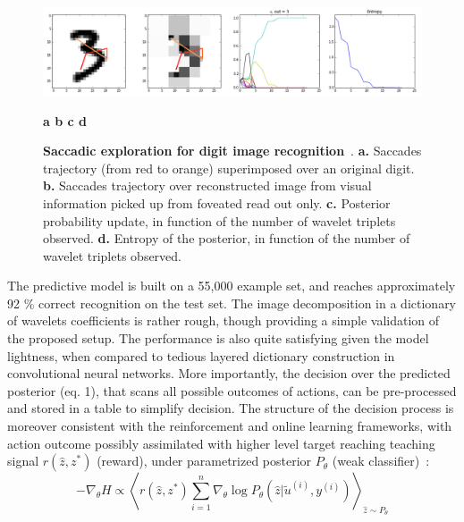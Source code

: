 \documentclass[12pt,twoside,openright]{article}
\begin{document}
	\begin{figure}[t!]
		\centerline{
				\includegraphics[width = \linewidth]{img/figure.png} 
		}
		\centerline{\bf a \hspace{4cm} b \hspace{4cm} c \hspace{4cm} d}
		\caption{\footnotesize{{\bf Saccadic exploration for digit image recognition}~. {\bf a.} Saccades trajectory (from red to orange) superimposed over an original digit. {\bf b.} Saccades trajectory over reconstructed image from visual information picked up from foveated read out only. {\bf c.} Posterior probability update, in function of the number of wavelet triplets observed. {\bf d.} Entropy of the posterior, in function of the number of wavelet triplets observed. } }
	\end{figure}
	
	The predictive model is built on a 55,000 example set, and reaches approximately 92 \% correct recognition on the test set. The image decomposition in a dictionary of wavelets coefficients is rather rough, though providing a simple validation of the proposed setup. The performance is also quite satisfying given the model lightness, when compared to tedious layered dictionary construction in convolutional neural networks. 
	More importantly, the decision over the predicted posterior (eq. 1), that scans all possible outcomes of actions, can be pre-processed and stored in a table to simplify decision. The structure of the decision process is moreover consistent with the reinforcement and online learning frameworks, with action outcome possibly assimilated with  higher level target reaching teaching signal $r(\hat{z},z^*)$ (reward),  under parametrized posterior $P_\theta$ (weak classifier)~:
	$$-\nabla_\theta H \propto \left\langle r(\hat{z},z^*) \sum_{i=1}^n \nabla_\theta \log P_\theta(\hat{z}|\tilde{u}^{(i)}, y^{(i)})\right\rangle_{\hat{z} \sim P_\theta}$$
	
	
	
	
\end{document}
